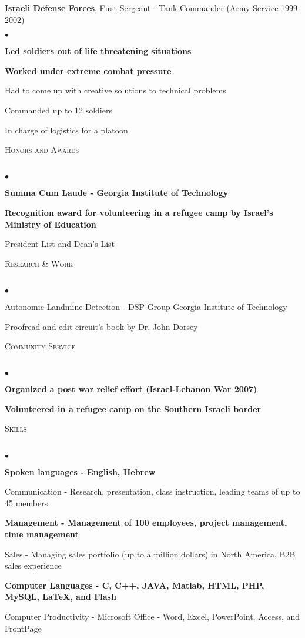 \documentclass[12pt]{article}
\newcommand{\lineunder}{\vspace*{-9pt} \\ \hspace*{-18pt} \hrulefill \\}
\newcommand{\header}[1]{{\hspace*{-15pt}\vspace*{6pt} \textsc{#1}} \vspace*{-9pt} \lineunder}
\newcommand{\employer}[2]{{ #1 (#2) }}
\newenvironment{achievements}{\begin{list}{$\bullet$}{\topsep 0pt \itemsep -2pt}}{\vspace*{4pt}\end{list}}
\begin{document}
\employer{\textbf{Israeli Defense Forces}, First Sergeant - Tank Commander}{Army Service 1999-2002}
	\begin{achievements}
    \item \textbf{Led soldiers out of life threatening situations}
	\item \textbf{Worked under extreme combat pressure}
    \item Had to come up with creative solutions to technical problems
	\item Commanded up to 12 soldiers
	\item In charge of logistics for a platoon
	\end{achievements}

\header{Honors and Awards}
\begin{achievements}
\item  \textbf{Summa Cum Laude - Georgia Institute of Technology}
\item  \textbf{Recognition award for volunteering in a refugee camp by Israel's Ministry of Education}
\item  President List and Dean's List
\end{achievements}

\header{Research \& Work}
\begin{achievements}
\item  Autonomic Landmine Detection - DSP Group Georgia Institute of Technology
\item  Proofread and edit circuit's book by Dr. John Dorsey
\end{achievements}

\header{Community Service}
\begin{achievements}
\item  \textbf{Organized a post war relief effort (Israel-Lebanon War 2007)}
\item  \textbf{Volunteered in a refugee camp on the Southern Israeli border}
\end{achievements}

\header{Skills}
\begin{achievements}
\item \textbf{Spoken languages - English, Hebrew}
\item Communication - Research, presentation, class instruction, leading teams of up to 45 members
\item \textbf{Management - Management of 100 employees, project management, time management}
\item Sales - Managing sales portfolio (up to a million dollars) in North America, B2B sales experience
\item \textbf{Computer Languages - C, C++, JAVA, Matlab, HTML, PHP, MySQL, \LaTeX, and Flash}
\item Computer Productivity	- Microsoft Office - Word, Excel, PowerPoint, Access, and FrontPage
\end{achievements}
\end{document}
